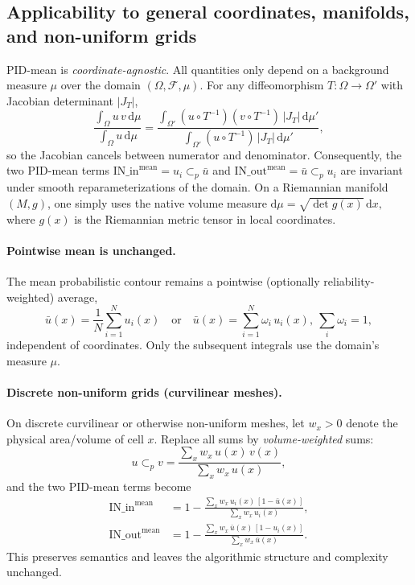 \documentclass[review,journal]{vgtc}              %
\begin{document}
\subsection{Applicability to general coordinates, manifolds, and non-uniform grids}
PID-mean is \emph{coordinate-agnostic}. All quantities only depend on a background measure $\mu$ over the domain $(\Omega,\mathcal F,\mu)$.
For any diffeomorphism $T:\Omega\!\to\!\Omega'$ with Jacobian determinant $|J_T|$,
\[
\frac{\int_\Omega u\,v\,\mathrm d\mu}{\int_\Omega u\,\mathrm d\mu}
=\frac{\int_{\Omega'} (u\!\circ\!T^{-1})(v\!\circ\!T^{-1})\,|J_T|\,\mathrm d\mu'}{\int_{\Omega'} (u\!\circ\!T^{-1})\,|J_T|\,\mathrm d\mu'} ,
\]
so the Jacobian cancels between numerator and denominator. Consequently, the two PID-mean terms
\(
\mathrm{IN\_in}^{\text{mean}}=u_i\subset_{\!p}\bar u
\)
and
\(
\mathrm{IN\_out}^{\text{mean}}=\bar u\subset_{\!p}u_i
\)
are invariant under smooth reparameterizations of the domain. On a Riemannian manifold $(M,g)$, one simply uses the native volume measure
\(
\mathrm d\mu=\sqrt{\det g(x)}\,\mathrm dx ,
\)
where $g(x)$ is the Riemannian metric tensor in local coordinates.



\paragraph{Pointwise mean is unchanged.}
The mean probabilistic contour remains a pointwise (optionally reliability-weighted) average,
\[
\bar u(x)=\frac{1}{N}\sum_{i=1}^N u_i(x)
\quad\text{or}\quad
\bar u(x)=\sum_{i=1}^N \omega_i\,u_i(x),\ \sum_i\omega_i=1,
\]
independent of coordinates. Only the subsequent integrals use the domain's measure $\mu$.

\paragraph{Discrete non-uniform grids (curvilinear meshes).}
On discrete curvilinear or otherwise non-uniform meshes, let $w_x>0$ denote the physical area/volume of cell $x$. Replace all sums by \emph{volume-weighted} sums:
\[
u\subset_{\!p}v=\frac{\sum_x w_x\,u(x)\,v(x)}{\sum_x w_x\,u(x)} ,
\]
and the two PID-mean terms become
\begin{align}
\mathrm{IN\_in}^{\text{mean}}
&=1-\frac{\sum_x w_x\,u_i(x)\,[1-\bar u(x)]}{\sum_x w_x\,u_i(x)}, \\
\mathrm{IN\_out}^{\text{mean}}
&=1-\frac{\sum_x w_x\,\bar u(x)\,[1-u_i(x)]}{\sum_x w_x\,\bar u(x)}.
\end{align}
This preserves semantics and leaves the algorithmic structure and complexity unchanged.
\end{document}
